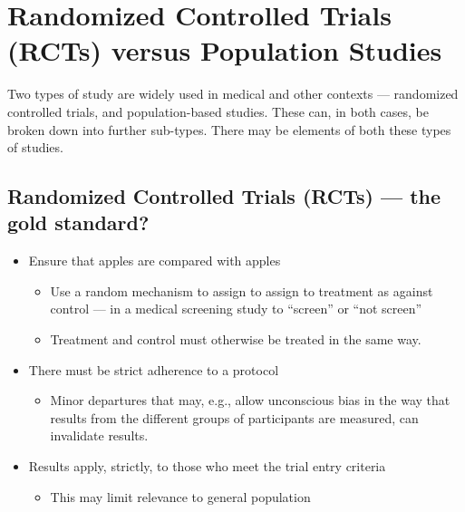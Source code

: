 \documentclass[
  10pt,
  b5paper]{book}
\providecommand{\tightlist}{%
  \setlength{\itemsep}{0pt}\setlength{\parskip}{0pt}}
\begin{document}
\hypertarget{ss:rct}{%
\section{Randomized Controlled Trials (RCTs) versus Population Studies}\label{ss:rct}}

Two types of study are widely used in medical and other contexts ---
randomized controlled trials, and population-based studies.
These can, in both cases, be broken down into further sub-types.
There may be elements of both these types of studies.

\hypertarget{randomized-controlled-trials-rcts-the-gold-standard}{%
\subsection*{Randomized Controlled Trials (RCTs) --- the gold standard?}\label{randomized-controlled-trials-rcts-the-gold-standard}}

\begin{itemize}
\tightlist
\item
  Ensure that apples are compared with apples

  \begin{itemize}
  \tightlist
  \item
    Use a random mechanism to assign to assign to treatment as
    against control --- in a medical screening study to
    ``screen'' or ``not screen''
  \item
    Treatment and control must otherwise be treated in the
    same way.
  \end{itemize}
\item
  There must be strict adherence to a protocol

  \begin{itemize}
  \tightlist
  \item
    Minor departures that may, e.g., allow unconscious bias
    in the way that results from the different groups of participants
    are measured, can invalidate results.
  \end{itemize}
\item
  Results apply, strictly, to those who meet the trial entry criteria

  \begin{itemize}
  \tightlist
  \item
    This may limit relevance to general population
  \end{itemize}
\end{itemize}
\end{document}
